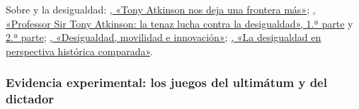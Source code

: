 \documentclass[11pt]{article}
\begin{document}
\begin{anotaciones}
Sobre  y la desigualdad:
\href{https://blognewdeal.com/andrea-lucai/tony-atkinson-nos-deja-una-frontera-mas/}{, «Tony Atkinson nos deja una frontera más»}\nocite{Lucai2017Atkinson};
\href{https://nadaesgratis.es/juan-francisco-jimeno/professor-sir-tony-atkinson-la-tenaz-lucha-contra-la-desigualdad-i}{, «Professor Sir Tony Atkinson: la tenaz lucha contra la desigualdad», 1.ª parte}\nocite{Jimeno2017AtkinsonI} y \href{https://nadaesgratis.es/juan-francisco-jimeno/professor-sir-tony-atkinson-la-tenaz-lucha-contra-la-desigualdad-ii}{2.ª parte}\nocite{Jimeno2017AtkinsonII};
\href{https://nadaesgratis.es/admin/desigualdad-movilidad-e-innovacion}{, «Desigualdad, movilidad e innovación»}\nocite{Llobet2016Desigualdad};
\href{https://nadaesgratis.es/bentolila/la-desigualdad-en-perspectiva-historica-comparada}{, «La desigualdad en perspectiva histórica comparada»}\nocite{Bentolila2014Desigualdad}.
\end{anotaciones}

\subsubsection{Evidencia experimental: los juegos del ultimátum y del dictador}\label{sec:experimentos}
\end{document}
